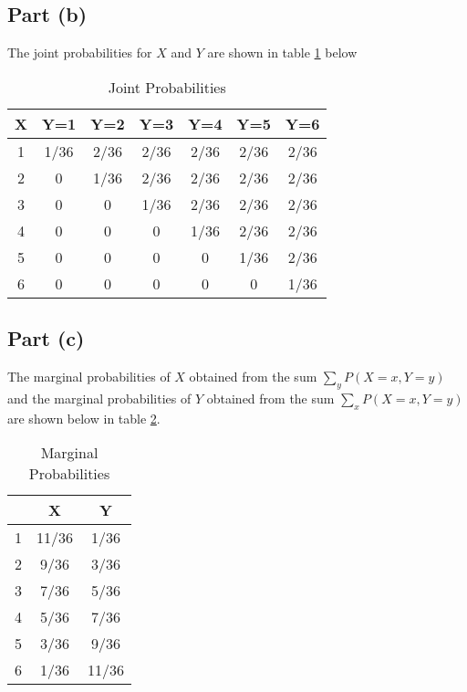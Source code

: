 \documentclass[11pt]{article}
\begin{document}
\subsection*{Part (b)}
The joint probabilities for $X$ and $Y$ are shown in table \ref{joints} below
\begin{table}[h!]
  \begin{center}
    \caption{Joint Probabilities}
    \label{joints}
    \begin{tabular}{c|c|c|c|c|c|c} %
      X & Y=1 & Y=2 & Y=3 & Y=4 & Y=5 & Y=6 \\
      \hline
      1 & 1/36 & 2/36 & 2/36 & 2/36 & 2/36 & 2/36 \\
      2 & 0 & 1/36 & 2/36 & 2/36 & 2/36 & 2/36 \\
      3 & 0 & 0 & 1/36 & 2/36 & 2/36 & 2/36 \\
      4 & 0 & 0 & 0 & 1/36 & 2/36 & 2/36 \\
      5 & 0 & 0 & 0 & 0 & 1/36 & 2/36 \\
      6 & 0 & 0 & 0 & 0 & 0 & 1/36 \\
    \end{tabular}
  \end{center}
\end{table}

\subsection*{Part (c)}
The marginal probabilities of $X$ obtained from the sum $\sum_yP(X=x,Y=y)$
and the marginal probabilities of $Y$ obtained from the sum $\sum_xP(X=x,Y=y)$ are shown below in table \ref{marginals}.
\begin{table}[h!]
  \begin{center}
    \caption{Marginal Probabilities}
    \label{marginals}
    \begin{tabular}{c|c|c} %
       & X & Y \\
      \hline
      1 & 11/36 & 1/36 \\
      2 & 9/36 & 3/36 \\
      3 & 7/36 & 5/36 \\
      4 & 5/36 & 7/36 \\
      5 & 3/36 & 9/36 \\
      6 & 1/36 & 11/36 \\
    \end{tabular}
  \end{center}
\end{table}
\end{document}

